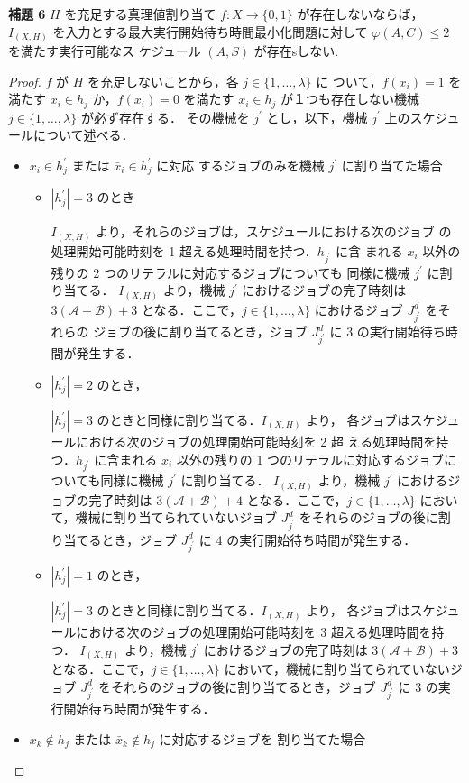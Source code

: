 \documentclass[12pt]{optlab-bachelor}
\begin{document}
\noindent \textbf{補題 6}
$H$ を充足する真理値割り当て $f : X \to \{0,1\}$ が存在しないならば，
$I_{(X,H)}$ を入力とする最大実行開始待ち時間最小化問題に対して
$\varphi(A, C) \le 2$ を満たす実行可能なス
ケジュール $(A, S)$ が存在sしない.\\ 

\begin{proof}
$f$ が $H$ を充足しないことから，各 $j \in \{1, \ldots, \lambda \}$ に
ついて，$f(x_i) = 1$ を満たす $x_i \in h_j$ か，$f(x_i) = 0$ を満たす
$\bar x_i \in h_j$ が１つも存在しない機械 $j \in \{1,\ldots, \lambda\}$ が必ず存在する．
その機械を $j^{\prime}$ とし，以下，機械 $j^{\prime}$ 上のスケジュールについて述べる．
\begin{itemize}
\item $x_i \in h_j^{\prime}$ または $\bar x_i \in h_j^{\prime}$ に対応
  するジョブのみを機械 $j^{\prime}$ に割り当てた場合
  \begin{itemize}
  \item $|h_j^{\prime}| = 3$ のとき
    
    $I_{(X,H)}$ より，それらのジョブは，スケジュールにおける次のジョブ
    の処理開始可能時刻を 1 超える処理時間を持つ．$h_{j^{\prime}}$ に含
    まれる $x_i$ 以外の残りの 2 つのリテラルに対応するジョブについても
    同様に機械 $j^{\prime}$ に割り当てる．
    $I_{(X,H)}$ より，機械 $j^{\prime}$ におけるジョブの完了時刻は
    $3(\mathcal{A} + \mathcal{B}) + 3$ となる．ここで，$j \in
    \{1,\ldots,\lambda\}$ におけるジョブ $J^d_{j^{\prime}}$ をそれらの
    ジョブの後に割り当てるとき，ジョブ $J^d_{j^{\prime}}$ に 3 の実行開始待ち時間が発生する．
  \item $|h_j^{\prime}| = 2$ のとき，
    
    $|h_j^{\prime}| = 3$ のときと同様に割り当てる．$I_{(X,H)}$ より，
    各ジョブはスケジュールにおける次のジョブの処理開始可能時刻を 2 超
    える処理時間を持つ．$h_{j^{\prime}}$ に含まれる $x_i$ 以外の残りの
    1 つのリテラルに対応するジョブについても同様に機械 $j^{\prime}$ に割り当てる．
    $I_{(X,H)}$ より，機械 $j^{\prime}$ におけるジョブの完了時刻は
    $3(\mathcal{A} + \mathcal{B}) + 4$ となる．ここで，$j \in
    \{1,\ldots,\lambda\}$ において，機械に割り当てられていないジョブ
    $J^d_{j^{\prime}}$ をそれらのジョブの後に割り当てるとき，ジョブ
    $J^d_{j^{\prime}}$ に 4 の実行開始待ち時間が発生する．
  \item  $|h_j^{\prime}| = 1$ のとき，
    
    $|h_j^{\prime}| = 3$ のときと同様に割り当てる．$I_{(X,H)}$ より，
    各ジョブはスケジュールにおける次のジョブの処理開始可能時刻を 3 超える処理時間を持つ．
    $I_{(X,H)}$ より，機械 $j^{\prime}$ におけるジョブの完了時刻は
    $3(\mathcal{A} + \mathcal{B}) + 3$ となる．ここで，$j \in
    \{1,\ldots,\lambda\}$ において，機械に割り当てられていないジョブ
    $J^d_{j^{\prime}}$ をそれらのジョブの後に割り当てるとき，ジョブ
    $J^d_{j^{\prime}}$ に 3 の実行開始待ち時間が発生する．
  \end{itemize}
\item $x_k \notin h_j$ または $\bar x_k \notin h_j$ に対応するジョブを
  割り当てた場合
  

\end{itemize}
\end{proof}
\end{document}
